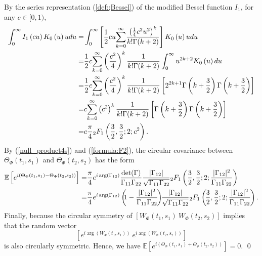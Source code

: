 \documentclass{amsart}
\begin{document}
By the series representation (\ref{def:;Bessel}) of the modified Bessel function $I_{1}$, for any $c\in[0,1)$,
\begin{align}\notag
\int_{0}^{\infty}
I_{1}\left(cu
\right)
K_{0}\left(u\right)
udu
=&\int_{0}^{\infty}\left[\frac{1}{2}cu
\overset{\infty}{\underset{k=0}{\sum}}\frac{\left(\frac{1}{4}c^{2}u^{2}\right)^{k}}{k! \Gamma(k+2)}\right]
K_{0}\left(u\right)
udu
\\\notag=&
\frac{1}{2}c\overset{\infty}{\underset{k=0}{\sum}}\left(\frac{c^{2}}{4}\right)^{k}\frac{1}{k! \Gamma(k+2)}
\int_{0}^{\infty}u^{2k+2}K_{0}\left(u\right)
du
\\\notag=&
\frac{1}{2}c\overset{\infty}{\underset{k=0}{\sum}}\left(\frac{c^{2}}{4}\right)^{k}\frac{1}{k! \Gamma(k+2)}
\left[2^{2k+1}\Gamma\left(k+\frac{3}{2}\right)\Gamma\left(k+\frac{3}{2}\right)\right]
\\\notag=&
c\overset{\infty}{\underset{k=0}{\sum}}\left(c^{2}\right)^{k}\frac{1}{k! \Gamma(k+2)}
\left[\Gamma\left(k+\frac{3}{2}\right)\Gamma\left(k+\frac{3}{2}\right)\right]
\\\label{formula:F2}=&c\frac{\pi}{4}{}_2F_1\left(\frac{3}{2},\frac{3}{2};2;c^{2}\right).
\end{align}
By (\ref{null_product4s}) and (\ref{formula:F2}), the circular covariance between $\Theta_{\Phi}(t_{1},s_{1})$ and $\Theta_{\Phi}(t_{2},s_{2})$ has the form
\begin{align}\notag
\mathbb{E}\left[e^{i(\Theta_{\Phi}(t_{1},s_{1})-\Theta_{\Phi}(t_{2},s_{2}))}\right]
=&
\frac{\pi}{4}e^{i\arg\left(\Gamma_{12}\right)}
\frac{\det(\Gamma)}{\Gamma_{11}\Gamma_{22}}\frac{|\Gamma_{12}|}{\sqrt{\Gamma_{11}\Gamma_{22}}}
{}_2F_1\left(\frac{3}{2},\frac{3}{2};2;\frac{|\Gamma_{12}|^{2}}{\Gamma_{11}\Gamma_{22}}\right)
\\\notag=&\frac{\pi}{4}e^{i\arg\left(\Gamma_{12}\right)}
\left(\hspace{-0.13cm}1-\frac{|\Gamma_{12}|^{2}}{\Gamma_{11}\Gamma_{22}}\hspace{-0.05cm}\right)\hspace{-0.1cm}\frac{|\Gamma_{12}|}{\sqrt{\Gamma_{11}\Gamma_{22}}}
{}_2F_1\left(\hspace{-0.05cm}\frac{3}{2},\frac{3}{2};2;\frac{|\Gamma_{12}|^{2}}{\Gamma_{11}\Gamma_{22}}\hspace{-0.03cm}\right).
\end{align}
Finally, because the circular symmetry of $[W_{\Phi}(t_{1},s_{1})\ W_{\Phi}(t_{2},s_{2})]$ implies that the random vector
$$\left[e^{i\arg(W_{\Phi}(t_{1},s_{1}))}\ e^{i\arg(W_{\Phi}(t_{2},s_{2}))}\right]$$
is also circularly symmetric.
Hence, we have $\mathbb{E}\left[e^{i(\Theta_{\Phi}(t_{1},s_{1})+\Theta_{\Phi}(t_{2},s_{2}))}\right]=0$.
\qed
\end{document}
